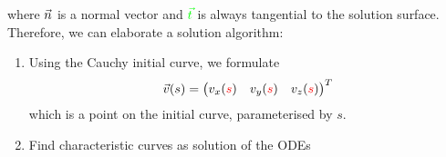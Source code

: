 where $\color{black}\vec{n}$ is a normal vector and $\color{green}\vec{t}$ is always tangential to the solution surface.
Therefore, we can elaborate a solution algorithm:
\begin{enumerate}
    \item{
        Using the Cauchy initial curve, we formulate
        \begin{align*}
            \vec{v}(s) = \begin{pmatrix}
                             v_x({\color{red}s} ) & v_y({\color{red}s}) & v_z({\color{red}s})
            \end{pmatrix}^T
        \end{align*}
        which is a point on the initial curve, parameterised by $s$.
    }
    \item{
        Find characteristic curves as solution of the ODEs

}
\end{enumerate}

